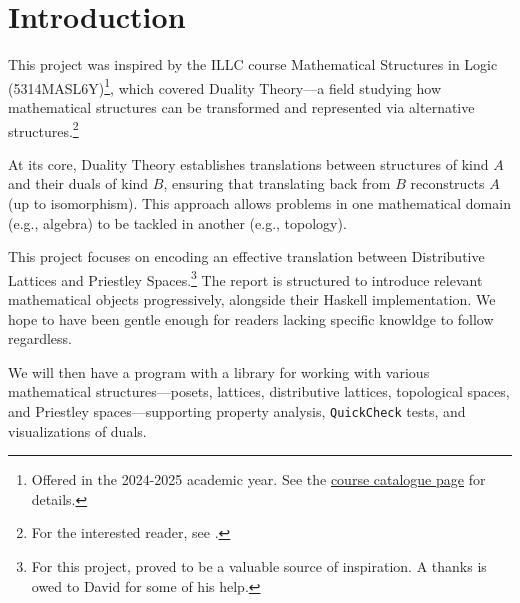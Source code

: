\section{Introduction}
\label{sec:introduction}
This project was inspired by the ILLC course Mathematical Structures in Logic (5314MASL6Y)\footnote{Offered in the 2024-2025 academic year. See the \href{https://studiegids.uva.nl/xmlpages/page/2024-2025-en/search-course/course/118785}{course catalogue page} for details.}, which covered Duality Theory—a field studying how mathematical structures can be transformed and represented via alternative structures.\footnote{For the interested reader, see \cite{burrisCourseUniversalAlgebra2012, daveyIntroductionLatticesOrder2010, johnstoneStoneSpaces1992, kelleyGeneralTopology2007, munkresTopology2000}.}

At its core, Duality Theory establishes translations between structures of kind $A$ and their duals of kind $B$, ensuring that translating back from $B$ reconstructs $A$ (up to isomorphism). This approach allows problems in one mathematical domain (e.g., algebra) to be tackled in another (e.g., topology).

This project focuses on encoding an effective translation between Distributive Lattices and Priestley Spaces.\footnote{For this project, \cite{quinnalvarezTopomodels2025} proved to be a valuable source of inspiration. A thanks is owed to David for some of his help.} The report is structured to introduce relevant mathematical objects progressively, alongside their Haskell implementation. We hope to have been gentle enough for readers lacking specific knowldge to follow regardless.

We will then have a program with a library for working with various mathematical structures—posets, lattices, distributive lattices, topological spaces, and Priestley spaces—supporting property analysis, \texttt{QuickCheck} tests, and visualizations of duals.







